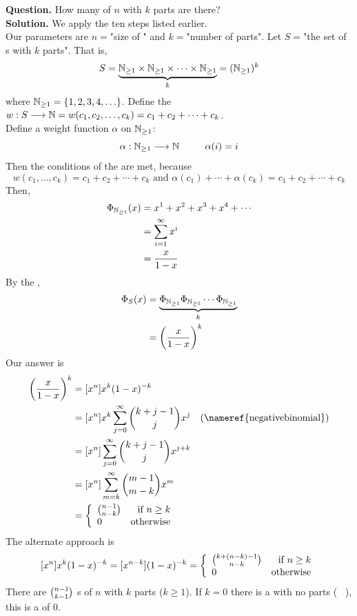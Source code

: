 \documentclass[english, 11pt]{article}
\begin{document}
  \textbf{Question.} How many  of $n$ with $k$ parts are there? \\
  \textbf{Solution.} We apply the ten steps listed earlier. \\
  Our parameters are $n = $"size of " and $k = $"number of parts". Let $S = $"the set of s with $k$ parts". That is,
  \[ S = \underbrace{{\mathbb{N}}_{\geq 1} \times {\mathbb{N}}_{\geq 1} \times \cdots \times {\mathbb{N}}_{\geq 1}}_{k} = ({\mathbb{N}}_{\geq 1})^k \]
  where ${\mathbb{N}}_{\geq 1} = \{ 1, 2, 3, 4, \ldots \}$. Define the  $w : S \longrightarrow {\mathbb{N}} = w(c_1, c_2, \ldots, c_k) = c_1 + c_2 + \cdots + c_k$. \\ Define a weight function $\alpha$ on ${\mathbb{N}}_{\geq 1}$:
  \[ \alpha : \N_{\geq 1} \longrightarrow  \N \mbox{ \ \ \ \ \ \ \  } \alpha(i) = i\]
  Then the conditions of the  are met, because
  \[ w(c_1, \ldots, c_k) = c_1 + c_2 + \cdots + c_k \mbox { \ and \ } \alpha(c_1) + \cdots + \alpha(c_k) = c_1 + c_2 + \cdots + c_k \]
  Then,
  \begin{align*}
     \Phi_{{\mathbb{N}}_{\geq 1}} (x) &= x^1 + x^2 + x^3 + x^4 + \cdots \\
     & = \sum_{i = 1}^{\infty} x^i  \\
     & = \frac{x}{1-x}
   \end{align*}
   By the ,
   \begin{align*}
    \Phi_S(x) & = \underbrace{\Phi_{{\mathbb{N}}_{\geq 1}}\Phi_{{\mathbb{N}}_{\geq 1}}\cdots\Phi_{{\mathbb{N}}_{\geq 1}}}_{k} \\
              & = \left( \frac{x}{1-x} \right)^k
   \end{align*}
   Our answer is
   \begin{align*}
     [x^n]\left( \f{x}{1-x} \right)^k & = [x^n]x^k(1-x)^{-k} \\
     & = [x^n] x^k \sum_{j=0}^{\infty} \comb{k+j-1}{j}x^j & \mbox {(\nameref{negativebinomial})}\\
     & = [x^n] \sum_{j=0}^{\infty} \comb{k+j-1}{j} x^{j+k} \\
     & = [x^n] \sum_{m = k}^{\infty} \comb{m-1}{m-k} x^m \\
     & = \piecewise{\comb{n-1}{n-k}}{if $n \geq k$}{0}{otherwise}
   \end{align*}
   The alternate approach is
   \[ [x^n]x^k(1-x)^{-k} = [x^{n-k}](1-x)^{-k} = \left\{ \begin{array}{lr} {k+(n-k)-1 \choose n-k} & \mbox{if $n \geq k$} \\ 0 & \mbox{otherwise} \end{array} \right. \]
   There are ${n-1 \choose k-1}$ s of $n$ with $k$ parts ($k \geq 1$). If $k = 0$ there is a  with no parts ( \ ), this is a  of 0.
\end{document}
